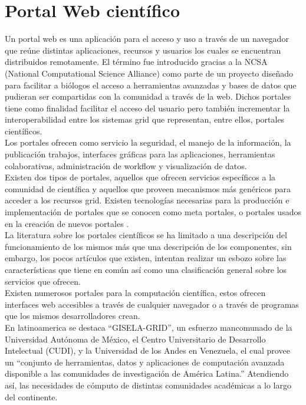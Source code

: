 \section{Portal Web científico}


Un portal web es una aplicación para el acceso y uso a través de un navegador que reúne distintas aplicaciones, recursos y usuarios los cuales se encuentran distribuidos remotamente. El término fue introducido gracias a la NCSA (National Computational Science Alliance) como parte de un proyecto diseñado para facilitar a biólogos el acceso a herramientas avanzadas y bases de datos que pudieran ser compartidas con la comunidad a través de la web. Dichos portales tiene como finalidad facilitar el acceso del usuario pero también incrementar la interoperabilidad entre los sistemas grid que representan, entre ellos, portales científicos. \\

Los portales ofrecen como servicio la seguridad, el manejo de la información, la publicación trabajos, interfaces gráficas para las aplicaciones, herramientas colaborativas, administración de workflow y visualización de datos\cite{Thomas:2005}. \\

Existen dos tipos de portales, aquellos que ofrecen servicios específicos a la comunidad de científica y aquellos que proveen mecanismos más genéricos para acceder a los recursos grid. Existen tecnologías necesarias para la producción e implementación de portales que se conocen como meta portales, o portales usados en la creación de nuevos portales\cite{Wiley:2006} \cite{Thomas:2006}. \\

La literatura sobre los portales científicos se ha limitado a una descripción del funcionamiento de los mismos más que una descripción de los componentes, sin embargo, los pocos artículos que existen, intentan realizar un esbozo sobre las características que tiene en común así como una clasificación general sobre los servicios que ofrecen.\\

Existen numerosos portales para la computación científica, estos ofrecen interfaces web accesibles a través de cualquier navegador o a través de programas que los mismos desarrolladores crean.\\

En latinoamerica se destaca “GISELA-GRID”, un esfuerzo mancomunado de la Universidad Autónoma de México, el Centro Universitario de Desarrollo Intelectual (CUDI), y la Universidad de los Andes en Venezuela, el cual provee un “conjunto de herramientas, datos y aplicaciones de computación avanzada disponible a las comunidades de investigación de América Latina.” Atendiendo así, las necesidades de cómputo de distintas comunidades académicas a lo largo del continente\cite{Gisela}.\\

